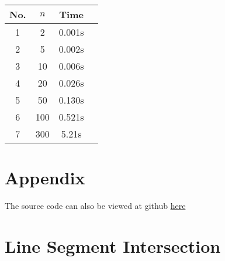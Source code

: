 \documentclass[11pt]{article}
\begin{document}
\begin{center}
    \begin{tabular}{c | c | c | c }
        No. & $n$ & Time   \\
        \hline %
        1   & 2   & 0.001s \\
        2   & 5   & 0.002s \\
        3   & 10  & 0.006s \\
        4   & 20  & 0.026s \\
        5   & 50  & 0.130s \\
        6   & 100 & 0.521s \\
        7   & 300 & 5.21s  \\
    \end{tabular}
\end{center}

\newpage

\section*{Appendix}
\par The source code can also be viewed at github \href{https://github.com/rohitkotha10/CS-F402_Assignment.git}{here}
\section*{Line Segment Intersection}
\end{document}
